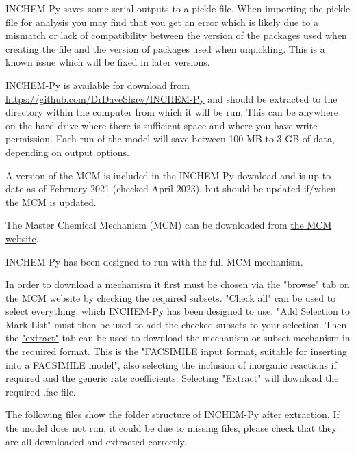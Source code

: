 \documentclass[a4paper]{refart}
\begin{document}
INCHEM-Py saves some serial outputs to a pickle file. When importing the pickle file for analysis you may find that you get an error which is likely due to a mismatch or lack of compatibility between the version of the packages used when creating the file and the version of packages used when unpickling. This is a known issue which will be fixed in later versions.


INCHEM-Py is available for download from \url{https://github.com/DrDaveShaw/INCHEM-Py} and should be extracted to the directory within the computer from which it will be run. This can be anywhere on the hard drive where there is sufficient space and where you have write permission. Each run of the model will save between 100 MB to 3 GB of data, depending on output options.


A version of the MCM is included in the INCHEM-Py download and is up-to-date as of February 2021 (checked April 2023), but should be updated if/when the MCM is updated.

\label{Downloading the MCM}

The Master Chemical Mechanism (MCM) can be downloaded from \href{http://mcm.york.ac.uk/home.htt}{the MCM website}.

INCHEM-Py has been designed to run with the full MCM mechanism.

In order to download a mechanism it first must be chosen via the \href{http://mcm.york.ac.uk/roots.htt}{"browse"} tab on the MCM website by checking the required subsets. "Check all" can be used to select everything, which INCHEM-Py has been designed to use. "Add Selection to Mark List" must then be used to add the checked subsets to your selection. Then the \href{http://mcm.york.ac.uk/extract.htt}{"extract"} tab can be used to download the mechanism or subset mechanism in the required format. This is the "FACSIMILE input format, suitable for inserting into a FACSIMILE model", also selecting the inclusion of inorganic reactions if required and the generic rate coefficients. Selecting "Extract" will download the required .fac file.

\newpage
{}

The following files show the folder structure of INCHEM-Py after extraction. If the model does not run, it could be due to missing files, please check that they are all downloaded and extracted correctly.
\end{document}
